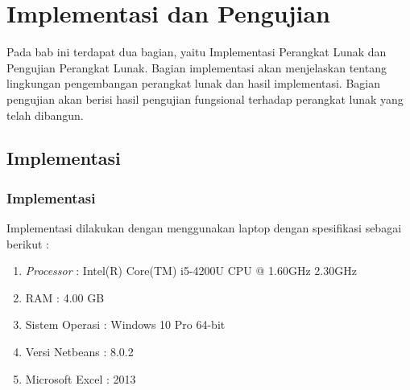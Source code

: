 \chapter{Implementasi dan Pengujian}
\label{chap:implementasi}

Pada bab ini terdapat dua bagian, yaitu Implementasi Perangkat Lunak dan Pengujian Perangkat Lunak. Bagian implementasi akan menjelaskan tentang lingkungan pengembangan perangkat lunak dan hasil implementasi. Bagian pengujian akan berisi hasil pengujian fungsional terhadap perangkat lunak yang telah dibangun.

\section{Implementasi}
\label{sec:implementasi}

\subsection{Implementasi}
Implementasi dilakukan dengan menggunakan laptop dengan spesifikasi sebagai berikut :
\begin{enumerate}
	\item \textit{Processor} : Intel(R) Core(TM) i5-4200U CPU @ 1.60GHz 2.30GHz
	\item RAM : 4.00 GB
	\item Sistem Operasi : Windows 10 Pro 64-bit
	\item Versi Netbeans : 8.0.2
	\item Microsoft Excel : 2013
\end{enumerate}

